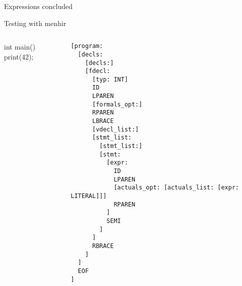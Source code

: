 \documentclass{plt}
\begin{document}
\begin{frame}[fragile=singleslide]{Expressions concluded}

\end{frame}

\begin{frame}[fragile=singleslide,t]{Testing with menhir}


\vspace{-2\baselineskip}

\begin{columns}
\begin{column}{0.2\textwidth}

\begin{C}
int main() {
  print(42);
}
\end{C}

\end{column}
\begin{column}{0.8\textwidth}
\fontsize{8}{7.5}\selectfont
\begin{verbatim}
[program:
  [decls:
    [decls:]
    [fdecl:
      [typ: INT]
      ID
      LPAREN
      [formals_opt:]
      RPAREN
      LBRACE
      [vdecl_list:]
      [stmt_list:
        [stmt_list:]
        [stmt:
          [expr:
            ID
            LPAREN
            [actuals_opt: [actuals_list: [expr: LITERAL]]]
            RPAREN
          ]
          SEMI
        ]
      ]
      RBRACE
    ]
  ]
  EOF
]
\end{verbatim}
\end{column}
\end{columns}
\end{frame}
\end{document}
